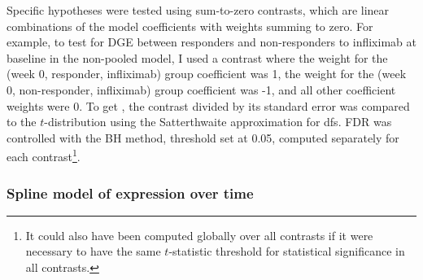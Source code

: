 Specific hypotheses were tested using sum-to-zero contrasts, which are linear combinations of the model coefficients with weights summing to zero.
For example, 
to test for \gls{DGE} between responders and non-responders to infliximab at baseline in the non-pooled model,
I used a contrast where
the weight for the (week 0, responder, infliximab) group coefficient was 1,
the weight for the (week 0, non-responder, infliximab) group coefficient was -1,
and all other coefficient weights were 0.
%
%
% 
To get \pvalues{}, the contrast divided by its standard error was compared to the $t$-distribution using the Satterthwaite approximation for \glspl{df}.
\Gls{FDR} was controlled with the \gls{BH} method, threshold set at 0.05, computed separately for each contrast\footnote{
It could also have been computed globally over all contrasts if it were necessary to have the same $t$-statistic threshold for statistical significance in all contrasts.
}.


\subsubsection{Spline model of expression over time}

